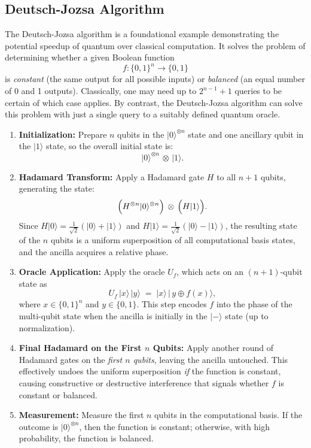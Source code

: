 \documentclass[%
 reprint,
 amsmath,amssymb,
 aps,
]{revtex4-2}
\begin{document}
\subsection{Deutsch-Jozsa Algorithm}
The Deutsch-Jozsa algorithm \cite{Deutsch1992} is a foundational example demonstrating the potential speedup of quantum over classical computation. It solves the problem of determining whether a given Boolean function 
\[
f: \{0,1\}^n \to \{0,1\}
\]
is \emph{constant} (the same output for all possible inputs) or \emph{balanced} (an equal number of 0 and 1 outputs). Classically, one may need up to $2^{n-1} + 1$ queries to be certain of which case applies. By contrast, the Deutsch-Jozsa algorithm can solve this problem with just a single query to a suitably defined quantum oracle.

\begin{enumerate}
    \item \textbf{Initialization:} 
    Prepare $n$ qubits in the $\lvert 0 \rangle^{\otimes n}$ state and one ancillary qubit in the $\lvert 1 \rangle$ state, so the overall initial state is:
    \[
    \lvert 0 \rangle^{\otimes n} \,\otimes\, \lvert 1 \rangle.
    \]
    
    \item \textbf{Hadamard Transform:} 
    Apply a Hadamard gate $H$ to all $n+1$ qubits, generating the state:
    \[
    \Bigl(H^{\otimes n}\lvert 0 \rangle^{\otimes n}\Bigr) \,\otimes\, \Bigl(H \lvert 1 \rangle\Bigr).
    \]
    Since $H \lvert 0 \rangle = \tfrac{1}{\sqrt{2}}(\lvert 0 \rangle + \lvert 1 \rangle)$ and 
    $H \lvert 1 \rangle = \tfrac{1}{\sqrt{2}}(\lvert 0 \rangle - \lvert 1 \rangle)$,
    the resulting state of the $n$ qubits is a uniform superposition of all computational basis states, and the ancilla acquires a relative phase.
    
    \item \textbf{Oracle Application:} 
    Apply the oracle $U_f$, which acts on an $(n+1)$-qubit state as
    \[
    U_f \,\lvert x \rangle \,\lvert y \rangle 
    \;=\; \lvert x \rangle \,\lvert\, y \oplus f(x)\rangle,
    \]
    where $x \in \{0,1\}^n$ and $y \in \{0,1\}$. This step encodes $f$ into the phase of the multi-qubit state when the ancilla is initially in the $\lvert - \rangle$ state (up to normalization).
    
    \item \textbf{Final Hadamard on the First $n$ Qubits:}
    Apply another round of Hadamard gates on the \emph{first $n$ qubits}, leaving the ancilla untouched. This effectively undoes the uniform superposition \emph{if} the function is constant, causing constructive or destructive interference that signals whether $f$ is constant or balanced.
    
    \item \textbf{Measurement:} 
    Measure the first $n$ qubits in the computational basis. If the outcome is $\lvert 0 \rangle^{\otimes n}$, then the function is constant; otherwise, with high probability, the function is balanced. 
\end{enumerate}
\end{document}
